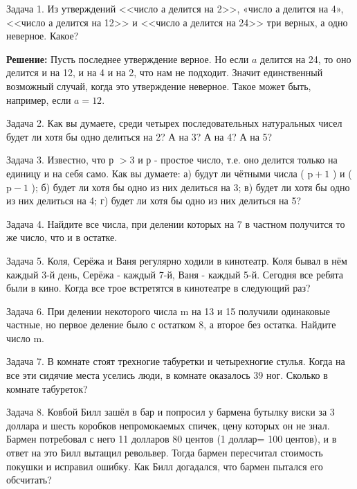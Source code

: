Задача 1. Из утверждений <<число а делится на 2>>, «число а делится на 4»,<<число а делится на 12>> и <<число а делится на 24>> три верных, а одно неверное. Какое?

\textbf{Решение:}
Пусть последнее утверждение верное. Но если $a$ делится на 24, то оно делится и на 12, и на 4 и на 2, что нам не подходит. Значит единственный возможный случай, когда это утверждение неверное. Такое может быть, например, если $a = 12.$

Задача 2. Как вы думаете, среди четырех последовательных натуральных чисел будет ли хотя бы одно делиться на 2? А на 3? А на 4? А на 5?

Задача 3. Известно, что р $>3$ и р - простое число, т.е. оно делится только на единицу и на себя само. Как вы думаете:
а) будут ли чётными числа ( $\mathrm{p}+1$ ) и ( $\mathrm{p}-1$ );
б) будет ли хотя бы одно из них делиться на 3;
в) будет ли хотя бы одно из них делиться на 4;
г) будет ли хотя бы одно из них делиться на 5?

Задача 4. Найдите все числа, при делении которых на 7 в частном получится то же число, что и в остатке.

Задача 5. Коля, Серёжа и Ваня регулярно ходили в кинотеатр. Коля бывал в нём каждый 3-й день, Серёжа - каждый 7-й, Ваня - каждый 5-й. Сегодня все ребята были в кино. Когда все трое встретятся в кинотеатре в следующий раз?

Задача 6. При делении некоторого числа m на 13 и 15 получили одинаковые частные, но первое деление было с остатком 8, а второе без остатка. Найдите число m.

Задача 7. В комнате стоят трехногие табуретки и четырехногие стулья. Когда на все эти сидячие места уселись люди, в комнате оказалось 39 ног. Сколько в комнате табуреток?

Задача 8. Ковбой Билл зашёл в бар и попросил у бармена бутылку виски за 3 доллара и шесть коробков непромокаемых спичек, цену которых он не знал. Бармен потребовал с него 11 долларов 80 центов (1 доллар= 100 центов), и в ответ на это Билл вытащил револьвер. Тогда бармен пересчитал стоимость покушки и исправил ошибку. Как Билл догадался, что бармен пытался его обсчитать?